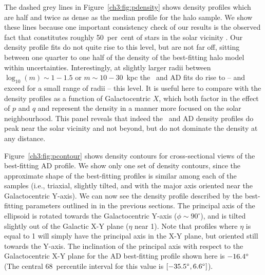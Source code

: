 The dashed grey lines in Figure~\ref{ch3:fig:pdensity} shows density profiles which are half and twice as dense as the median profile for the halo sample. We show these lines because one important consistency check of our results is the observed fact that \gse constitutes roughly 50~per~cent of stars in the solar vicinity \parencite{belokurov18,lancaster19,fattahi19}. Our \gse density profile fits do not quite rise to this level, but are not far off, sitting between one quarter to one half of the density of the best-fitting halo model within uncertainties. Interestingly, at slightly larger radii between $\log_{10}(m) \sim 1-1.5 $ or $ m \sim 10-30$~kpc the \eLz\ and AD fits do rise to -- and exceed for a small range of radii -- this level. It is useful here to compare with the density profiles as a function of Galactocentric $X$, which both factor in the effect of $p$ and $q$ and represent the density in a manner more focused on the solar neighbourhood. This panel reveals that indeed the \eLz\ and AD density profiles do peak near the solar vicinity and not beyond, but do not dominate the density at any distance.

Figure~\ref{ch3:fig:pcontour} shows density contours for cross-sectional views of the best-fitting AD profile. We show only one set of density contours, since the approximate shape of the best-fitting profiles is similar among each of the samples (i.e., triaxial, slightly tilted, and with the major axis oriented near the Galactocentric Y-axis). We can now see the density profile described by the best-fitting parameters outlined in in the previous sections. The principal axis of the ellipsoid is rotated towards the Galactocentric Y-axis ($\phi \sim 90^{\circ}$), and is tilted slightly out of the Galactic X-Y plane ($\eta$ near 1). Note that profiles where $\eta$ is equal to 1 will simply have the principal axis in the X-Y plane, but oriented still towards the Y-axis. The inclination of the principal axis with respect to the Galactocentric X-Y plane for the AD best-fitting profile shown here is $-16.4\hbox{$^\circ$}$ (The central 68~percentile interval for this value is $[-35.5\hbox{$^\circ$},6.6\hbox{$^\circ$}]$).

